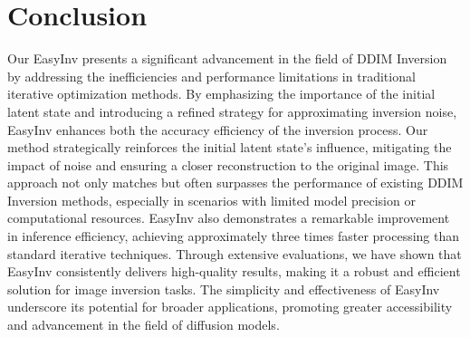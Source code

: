 \documentclass[letterpaper]{article} \usepackage{aaai25}  \usepackage{times}  \usepackage{helvet}  \usepackage{courier}  \usepackage[hyphens]{url}  \usepackage{graphicx} \urlstyle{rm} \def\UrlFont{\rm}  \usepackage{natbib}  \usepackage{caption} \frenchspacing  \setlength{\pdfpagewidth}{8.5in} \setlength{\pdfpageheight}{11in} \usepackage{algorithm}
\begin{document}
\section{Conclusion}
Our EasyInv presents a significant advancement in the field of DDIM Inversion by addressing the inefficiencies and performance limitations in traditional iterative optimization methods. By emphasizing the importance of the initial latent state and introducing a refined strategy for approximating inversion noise, EasyInv enhances both the accuracy efficiency of the inversion process. Our method strategically reinforces the initial latent state's influence, mitigating the impact of noise and ensuring a closer reconstruction to the original image. This approach not only matches but often surpasses the performance of existing DDIM Inversion methods, especially in scenarios with limited model precision or computational resources. EasyInv also demonstrates a remarkable improvement in inference efficiency, achieving approximately three times faster processing than standard iterative techniques. Through extensive evaluations, we have shown that EasyInv consistently delivers high-quality results, making it a robust and efficient solution for image inversion tasks. The simplicity and effectiveness of EasyInv underscore its potential for broader applications, promoting greater accessibility and advancement in the field of diffusion models.
\end{document}
